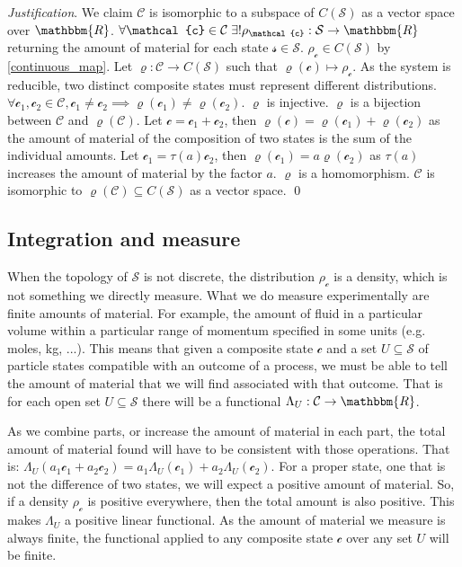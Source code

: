 \documentclass[aps,pra,10pt,twocolumn,floatfix,nofootinbib]{revtex4-1}
\numberwithin{equation}{section}
\theoremstyle{definition}
\newenvironment{justification}{\emph{Justification}.}{\qed}
\begin{document}
\begin{justification}
We claim $\mathcal{C}$ is isomorphic to a subspace of $C(\mathcal{S})$ as a vector space over $\mathbbm{R}$. $\forall \mathcal{c} \in \mathcal{C} \; \exists ! \rho_{\mathcal{c}}:\mathcal{S} \rightarrow \mathbbm{R}$ returning the amount of material for each state $\mathcal{s} \in \mathcal{S}$. $\rho_{\mathcal{c}} \in C(\mathcal{S})$ by \ref{continuous_map}. Let $\varrho : \mathcal{C} \rightarrow C(\mathcal{S})$ such that $\varrho(\mathcal{c}) \mapsto \rho_\mathcal{c}$. 
As the system is reducible, two distinct composite states must represent different distributions. $\forall \mathcal{c_1}, \mathcal{c_2} \in \mathcal{C}, \mathcal{c_1} \neq \mathcal{c_2} \implies \varrho(\mathcal{c_1}) \neq \varrho(\mathcal{c_2})$. $\varrho$ is injective. $\varrho$ is a bijection between $\mathcal{C}$ and $\varrho(\mathcal{C})$. Let $\mathcal{c}=\mathcal{c}_1+\mathcal{c}_2$, then $\varrho(\mathcal{c})=\varrho(\mathcal{c}_1)+\varrho(\mathcal{c}_2)$ as the amount of material of the composition of two states is the sum of the individual amounts. Let $\mathcal{c}_1=\tau(a)\mathcal{c}_2$, then $\varrho(\mathcal{c}_1)=a \varrho(\mathcal{c}_2)$ as $\tau(a)$ increases the amount of material by the factor $a$. $\varrho$ is a homomorphism. $\mathcal{C}$ is isomorphic to $\varrho(\mathcal{C}) \subseteq C(\mathcal{S})$ as a vector space.
\end{justification}

\subsection{Integration and measure}

When the topology of $\mathcal{S}$ is not discrete, the distribution $\rho_\mathcal{c}$ is a density, which is not something we directly measure. What we do measure experimentally are finite amounts of material. For example, the amount of fluid in a particular volume within a particular range of momentum specified in some units (e.g. moles, kg, ...). This means that given a composite state $\mathcal{c}$ and a set $U \subseteq \mathcal{S}$ of particle states compatible with an outcome of a process, we must be able to tell the amount of material that we will find associated with that outcome. That is for each open set $U \subseteq \mathcal{S}$ there will be a functional $\Lambda_U : \mathcal{C} \rightarrow \mathbbm{R}$.

As we combine parts, or increase the amount of material in each part, the total amount of material found will have to be consistent with those operations. That is: $\Lambda_U(a_1 \mathcal{c}_1 + a_2 \mathcal{c}_2) = a_1 \Lambda_U(\mathcal{c}_1) + a_2 \Lambda_U(\mathcal{c}_2)$. For a proper state, one that is not the difference of two states, we will expect a positive amount of material. So, if a density $\rho_\mathcal{c}$ is positive everywhere, then the total amount is also positive. This makes $\Lambda_U$ a positive linear functional. As the amount of material we measure is always finite, the functional applied to any composite state $\mathcal{c}$ over any set $U$ will be finite.
\end{document}
